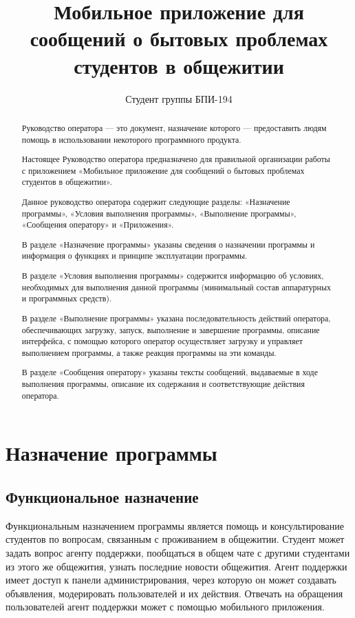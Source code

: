 \documentclass{../includes/TechDoc}
\title{Мобильное приложение для сообщений о бытовых проблемах студентов в общежитии}
\author{Студент группы БПИ-194}{В. А. Анненков}
\begin{document}
    \maketitle

    \begin{abstract}
        Руководство оператора — это документ, назначение которого — предоставить людям помощь в использовании некоторого программного продукта.

        Настоящее Руководство оператора предназначено для правильной организации работы с приложением «Мобильное приложение для сообщений о бытовых проблемах студентов в общежитии».

        Данное руководство оператора содержит следующие разделы: «Назначение программы», «Условия выполнения программы», «Выполнение программы», «Сообщения оператору» и «Приложения».

        В разделе «Назначение программы» указаны сведения о назначении программы и информация о функциях и принципе эксплуатации программы.

        В разделе «Условия выполнения программы» содержится информацию об условиях, необходимых для выполнения данной программы (минимальный состав аппаратурных и программных средств).

        В разделе «Выполнение программы» указана последовательность действий оператора, обеспечивающих загрузку, запуск, выполнение и завершение программы, описание интерфейса, с помощью которого оператор осуществляет загрузку и управляет выполнением программы, а также реакция программы на эти команды.

        В разделе «Сообщения оператору» указаны тексты сообщений, выдаваемые в ходе выполнения программы, описание их содержания и соответствующие действия оператора.
    \end{abstract}

    \newpage

    \tableofcontents


    \section{Назначение программы}

    \subsection{Функциональное назначение}

    Функциональным назначением программы является помощь и консультирование студентов по вопросам, связанным
    с проживанием в общежитии. Студент может задать вопрос агенту поддержки, пообщаться в общем чате с другими
    студентами из этого же общежития, узнать последние новости общежития. Агент поддержки имеет доступ к панели
    администрирования, через которую он может создавать объявления, модерировать пользователей и их действия. Отвечать
    на обращения пользователей агент поддержки может с помощью мобильного приложения.
\end{document}
